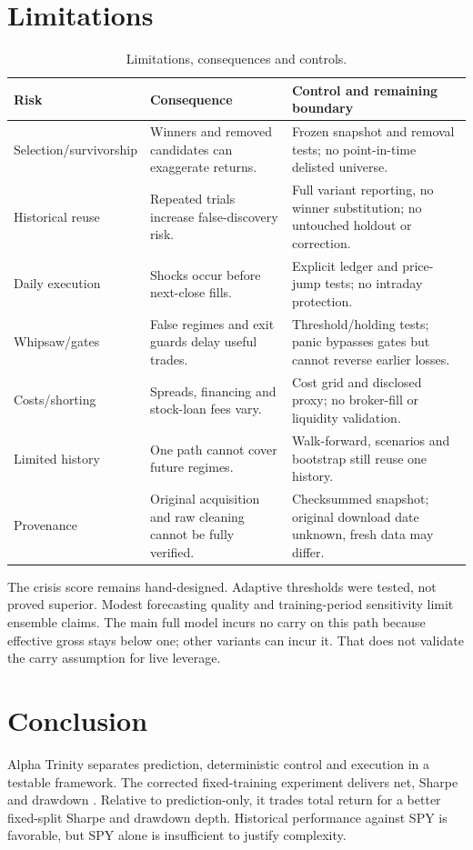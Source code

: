 \documentclass[3p,times]{elsarticle}
\begin{document}
\section{Limitations}
\begin{table}[htbp]\centering\small
\caption{Limitations, consequences and controls.}\label{tab:limitations}
\begin{tabularx}{\textwidth}{lXX}\toprule
Risk & Consequence & Control and remaining boundary \\\midrule
Selection/survivorship & Winners and removed candidates can exaggerate returns. & Frozen snapshot and removal tests; no point-in-time delisted universe. \\
Historical reuse & Repeated trials increase false-discovery risk. & Full variant reporting, no winner substitution; no untouched holdout or correction. \\
Daily execution & Shocks occur before next-close fills. & Explicit ledger and price-jump tests; no intraday protection. \\
Whipsaw/gates & False regimes and exit guards delay useful trades. & Threshold/holding tests; panic bypasses gates but cannot reverse earlier losses. \\
Costs/shorting & Spreads, financing and stock-loan fees vary. & Cost grid and disclosed proxy; no broker-fill or liquidity validation. \\
Limited history & One path cannot cover future regimes. & Walk-forward, scenarios and bootstrap still reuse one history. \\
Provenance & Original acquisition and raw cleaning cannot be fully verified. & Checksummed snapshot; original download date unknown, fresh data may differ. \\\bottomrule
\end{tabularx}\end{table}

The crisis score remains hand-designed. Adaptive thresholds were tested, not proved superior. Modest forecasting quality and training-period sensitivity limit ensemble claims. The main full model incurs no carry on this path because effective gross stays below one; other variants can incur it. That does not validate the carry assumption for live leverage.

\section{Conclusion}
Alpha Trinity separates prediction, deterministic control and execution in a testable framework. The corrected fixed-training experiment delivers \FullReturn{} net, Sharpe \FullSharpe{} and drawdown \FullDrawdown{}. Relative to prediction-only, it trades total return for a better fixed-split Sharpe and drawdown depth. Historical performance against SPY is favorable, but SPY alone is insufficient to justify complexity.
\end{document}
